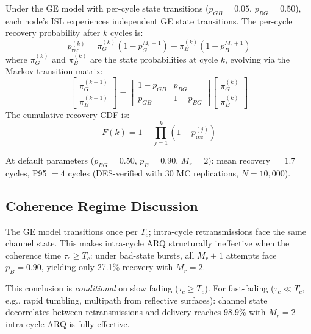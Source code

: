 \documentclass[journal]{IEEEtran}
\begin{document}
Under the GE model with per-cycle state transitions ($p_{GB} = 0.05$, $p_{BG} = 0.50$), each node's ISL experiences independent GE state transitions. The per-cycle recovery probability after $k$ cycles is:
\begin{equation}
    p_{\text{rec}}^{(k)} = \pi_G^{(k)}(1 - p_G^{M_r+1}) + \pi_B^{(k)}(1 - p_B^{M_r+1})
    \label{eq:supp_recovery}
\end{equation}
where $\pi_G^{(k)}$ and $\pi_B^{(k)}$ are the state probabilities at cycle $k$, evolving via the Markov transition matrix:
\begin{equation}
    \begin{bmatrix} \pi_G^{(k+1)} \\ \pi_B^{(k+1)} \end{bmatrix}
    = \begin{bmatrix} 1 - p_{GB} & p_{BG} \\ p_{GB} & 1 - p_{BG} \end{bmatrix}
    \begin{bmatrix} \pi_G^{(k)} \\ \pi_B^{(k)} \end{bmatrix}
\end{equation}
The cumulative recovery CDF is:
\begin{equation}
    F(k) = 1 - \prod_{j=1}^{k}(1 - p_{\text{rec}}^{(j)})
\end{equation}

At default parameters ($p_{BG} = 0.50$, $p_B = 0.90$, $M_r = 2$): mean recovery $= 1.7$ cycles, P95 $= 4$ cycles (DES-verified with 30 MC replications, $N = 10{,}000$).

\subsection{Coherence Regime Discussion}

The GE model transitions once per $T_c$; intra-cycle retransmissions face the same channel state. This makes intra-cycle ARQ structurally ineffective when the coherence time $\tau_c \geq T_c$: under bad-state bursts, all $M_r + 1$ attempts face $p_B = 0.90$, yielding only 27.1\% recovery with $M_r = 2$.

This conclusion is \emph{conditional} on slow fading ($\tau_c \geq T_c$). For fast-fading ($\tau_c \ll T_c$, e.g., rapid tumbling, multipath from reflective surfaces): channel state decorrelates between retransmissions and delivery reaches 98.9\% with $M_r = 2$---intra-cycle ARQ is fully effective.
\end{document}
